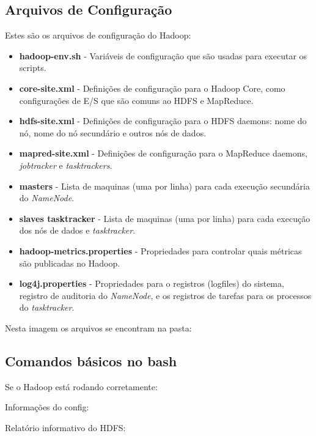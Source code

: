 \documentclass[a4paper,11pt]{article}
\begin{document}
\subsection{Arquivos de Configuração}
Estes são os arquivos de configuração do Hadoop: \vspace{-1em}
\begin{itemize}
	\item \textbf{hadoop-env.sh} - Variáveis de configuração que são usadas para executar os scripts.
	\item \textbf{core-site.xml} - Definições de configuração para o Hadoop Core, como configurações de E/S que são comuns ao HDFS e MapReduce.
	\item \textbf{hdfs-site.xml} - Definições de configuração para o HDFS daemons: nome do nó, nome do nó secundário e outros nós de dados.
	\item \textbf{mapred-site.xml} - Definições de configuração para o MapReduce daemons, \textit{jobtracker} e \textit{tasktrackers}.
	\item \textbf{masters} - Lista de maquinas (uma por linha) para cada execução secundária do \textit{NameNode}.
	\item \textbf{slaves tasktracker} - Lista de maquinas (uma por linha) para cada execução dos nós de dados e \textit{tasktracker}.
	\item \textbf{hadoop-metrics.properties} - Propriedades para controlar quais métricas são publicadas no Hadoop.
	\item \textbf{log4j.properties} - Propriedades para o registros (logfiles) do sistema, registro de auditoria do \textit{NameNode}, e os registros de tarefas para os processos do \textit{tasktracker}.
\end{itemize}

Nesta imagem os arquivos se encontram na pasta: \\

\subsection{Comandos básicos no bash}
Se o Hadoop está rodando corretamente: \\

Informações do config: \\

Relatório informativo do HDFS: \\
\end{document}
